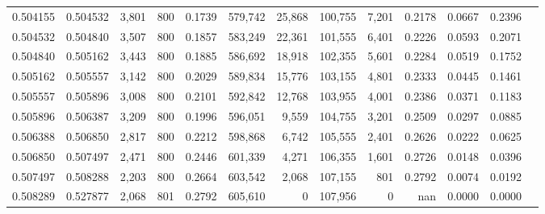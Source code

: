 \begin{tabular}{rrrrrrrrrrrrr}
0.504155 & 0.504532 & 3,801 & 800 &                                     0.1739 & 579,742 &  25,868 & 100,755 &   7,201 & 0.2178 & 0.0667 & 0.2396 \\
0.504532 & 0.504840 & 3,507 & 800 &                                     0.1857 & 583,249 &  22,361 & 101,555 &   6,401 & 0.2226 & 0.0593 & 0.2071 \\
0.504840 & 0.505162 & 3,443 & 800 &                                     0.1885 & 586,692 &  18,918 & 102,355 &   5,601 & 0.2284 & 0.0519 & 0.1752 \\
0.505162 & 0.505557 & 3,142 & 800 &                                     0.2029 & 589,834 &  15,776 & 103,155 &   4,801 & 0.2333 & 0.0445 & 0.1461 \\
0.505557 & 0.505896 & 3,008 & 800 &                                     0.2101 & 592,842 &  12,768 & 103,955 &   4,001 & 0.2386 & 0.0371 & 0.1183 \\
0.505896 & 0.506387 & 3,209 & 800 &                                     0.1996 & 596,051 &   9,559 & 104,755 &   3,201 & 0.2509 & 0.0297 & 0.0885 \\
0.506388 & 0.506850 & 2,817 & 800 &                                     0.2212 & 598,868 &   6,742 & 105,555 &   2,401 & 0.2626 & 0.0222 & 0.0625 \\
0.506850 & 0.507497 & 2,471 & 800 &                                     0.2446 & 601,339 &   4,271 & 106,355 &   1,601 & 0.2726 & 0.0148 & 0.0396 \\
0.507497 & 0.508288 & 2,203 & 800 &                                     0.2664 & 603,542 &   2,068 & 107,155 &     801 & 0.2792 & 0.0074 & 0.0192 \\
0.508289 & 0.527877 & 2,068 & 801 &                                     0.2792 & 605,610 &       0 & 107,956 &       0 &    nan & 0.0000 & 0.0000 \\
\bottomrule
\end{tabular}
